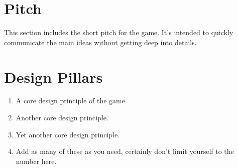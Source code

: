 

\newcommand{\gddTitle}{Game Name}
\newcommand{\gddSubtitle}{Game Subtitle}
\newcommand{\gddCompany}{Company Name}
\newcommand{\gddAuthors}{Firstname Lastname, Firstname Lastname, Firstname Lastname}
\newcommand{\gddDate}{January 1st, 1960}
\newcommand{\gddVersion}{1.0.0}

\newcommand{\gddChangelogEntries}{
\gddChangelogEntry{0.1.0}{January 1st, 1960}{
Changelog List\begin{itemize}
\item Point A
\item Point B
\item Point C
\end{itemize}}
\gddChangelogEntry{0.0.1}{January 1st, 1960}{Changelog Modified}
\gddChangelogEntry{0.0.0}{January 1st, 1960}{Changelog Created}
}



\gddTitlesection
\gddTOC

\section{Pitch}

This section includes the short pitch for the game. It's intended to quickly communicate the main ideas without getting deep into details.

\section{Design Pillars}

\begin{enumerate}
	\item A core design principle of the game.
	\item Another core design principle.
	\item Yet another core design principle.
	\item Add as many of these as you need, certainly don't limit yourself to the number here.
\end{enumerate}


\newpage

\switchToAppendix
\gddChangelog


